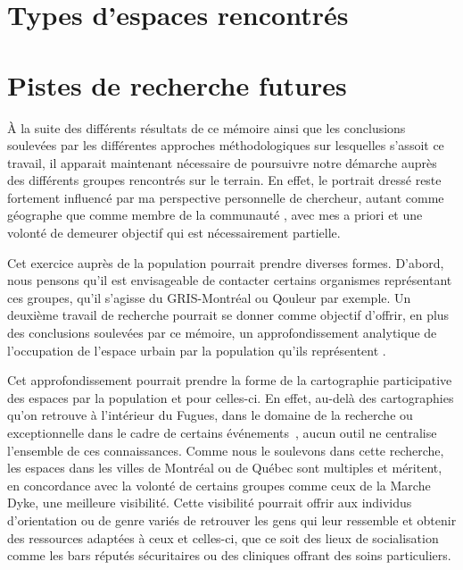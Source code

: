 \section{Types d'espaces rencontrés}
\label{sec:types_d_espaces_rencontr_s}


\section{Pistes de recherche futures}
\label{sec:pistes_de_recherches}

À la suite des différents résultats de ce mémoire ainsi que les conclusions soulevées par les différentes approches méthodologiques sur lesquelles s'assoit ce travail, il apparait maintenant nécessaire de poursuivre notre démarche auprès des différents groupes rencontrés sur le terrain.
En effet, le portrait dressé reste fortement influencé par ma perspective personnelle de chercheur, autant comme géographe que comme membre de la communauté \lgbt{}, avec mes a priori et une volonté de demeurer objectif qui est nécessairement partielle.

Cet exercice auprès de la population pourrait prendre diverses formes.
D'abord, nous pensons qu'il est envisageable de contacter certains organismes représentant ces groupes, qu'il s'agisse du GRIS-Montréal ou Qouleur par exemple.
Un deuxième travail de recherche pourrait se donner comme objectif d'offrir, en plus des conclusions soulevées par ce mémoire, un approfondissement analytique de l'occupation de l'espace urbain par la population qu'ils représentent .

Cet approfondissement pourrait prendre la forme de la cartographie participative des espaces \lgbt{} par la population et pour celles-ci.
En effet, au-delà des cartographies qu'on retrouve à l'intérieur du Fugues, dans le domaine de la recherche  ou exceptionnelle dans le cadre de certains événements~\parencite{Pervers/Cite2015}, aucun outil ne centralise l'ensemble de ces connaissances.
Comme nous le soulevons dans cette recherche, les espaces \lgbt{} dans les villes de Montréal ou de Québec sont multiples et méritent, en concordance avec la volonté de certains groupes comme ceux de la Marche Dyke, une meilleure visibilité.
Cette visibilité pourrait offrir aux individus d'orientation ou de genre variés de retrouver les gens qui leur ressemble et obtenir des ressources adaptées à ceux et celles-ci, que ce soit des lieux de socialisation comme les bars réputés sécuritaires ou des cliniques offrant des soins particuliers.

